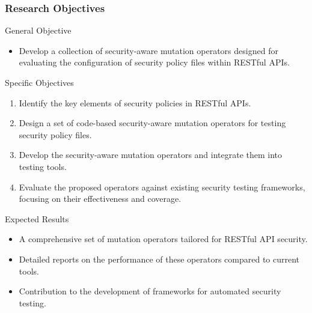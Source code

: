 \documentclass[12pt]{beamer}
\theoremstyle{remark}
\theoremstyle{definition}
\begin{document}
\begin{frame}[allowframebreaks]
\frametitle{Research Objectives}
\begin{block}{General Objective}
\begin{itemize}
    \item Develop a collection of security-aware mutation operators designed for evaluating the configuration of security policy files within RESTful APIs.
\end{itemize}
\end{block}

\begin{block}{Specific Objectives}
\begin{enumerate}
    \item Identify the key elements of security policies in RESTful APIs.
    \item Design a set of code-based security-aware mutation operators for testing security policy files.
    \item Develop the security-aware mutation operators and integrate them into testing tools.
    \item Evaluate the proposed operators against existing security testing frameworks, focusing on their effectiveness and coverage.
\end{enumerate}
\end{block}

\begin{block}{Expected Results}
\begin{itemize}
    \item A comprehensive set of mutation operators tailored for RESTful API security.
    \item Detailed reports on the performance of these operators compared to current tools.
    \item Contribution to the development of frameworks for automated security testing.
\end{itemize}
\end{block}
\end{frame}
\end{document}
